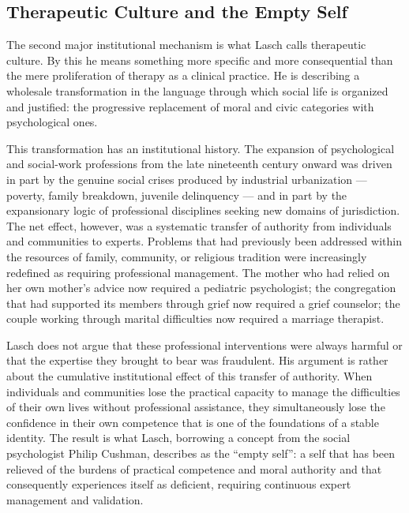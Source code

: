 \documentclass[12pt]{memoir}
\begin{document}
\subsection{Therapeutic Culture and the Empty Self}

The second major institutional mechanism is what Lasch calls therapeutic culture. By this he
means something more specific and more consequential than the mere proliferation of therapy as
a clinical practice. He is describing a wholesale transformation in the language through which
social life is organized and justified: the progressive replacement of moral and civic
categories with psychological ones.

This transformation has an institutional history. The expansion of psychological and social-work
professions from the late nineteenth century onward was driven in part by the genuine social
crises produced by industrial urbanization — poverty, family breakdown, juvenile delinquency —
and in part by the expansionary logic of professional disciplines seeking new domains of
jurisdiction. The net effect, however, was a systematic transfer of authority from individuals
and communities to experts. Problems that had previously been addressed within the resources
of family, community, or religious tradition were increasingly redefined as requiring
professional management. The mother who had relied on her own mother's advice now required a
pediatric psychologist; the congregation that had supported its members through grief now
required a grief counselor; the couple working through marital difficulties now required a
marriage therapist.\citep[189--195]{lasch1979}

Lasch does not argue that these professional interventions were always harmful or that the
expertise they brought to bear was fraudulent. His argument is rather about the cumulative
institutional effect of this transfer of authority. When individuals and communities lose the
practical capacity to manage the difficulties of their own lives without professional
assistance, they simultaneously lose the confidence in their own competence that is one of the
foundations of a stable identity. The result is what Lasch, borrowing a concept from the social
psychologist Philip Cushman, describes as the \enquote{empty self}: a self that has been
relieved of the burdens of practical competence and moral authority and that consequently
experiences itself as deficient, requiring continuous expert management and validation.
\end{document}
